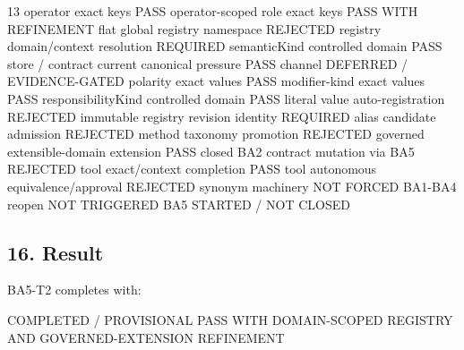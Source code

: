 \documentclass[
  10pt,
  a4paper,
]{article}
\newenvironment{Shaded}{}{}
\newcommand{\NormalTok}[1]{#1}
\begin{document}
\begin{Shaded}
\begin{Highlighting}[]
\NormalTok{13 operator exact keys                                  PASS}
\NormalTok{operator{-}scoped role exact keys                         PASS WITH REFINEMENT}
\NormalTok{flat global registry namespace                          REJECTED}
\NormalTok{registry domain/context resolution                      REQUIRED}
\NormalTok{semanticKind controlled domain                          PASS}
\NormalTok{store / contract current canonical pressure             PASS}
\NormalTok{channel                                                  DEFERRED / EVIDENCE{-}GATED}
\NormalTok{polarity exact values                                    PASS}
\NormalTok{modifier{-}kind exact values                              PASS}
\NormalTok{responsibilityKind controlled domain                    PASS}
\NormalTok{literal value auto{-}registration                         REJECTED}
\NormalTok{immutable registry revision identity                    REQUIRED}
\NormalTok{alias candidate admission                               REJECTED}
\NormalTok{method taxonomy promotion                               REJECTED}
\NormalTok{governed extensible{-}domain extension                    PASS}
\NormalTok{closed BA2 contract mutation via BA5                     REJECTED}
\NormalTok{tool exact/context completion                           PASS}
\NormalTok{tool autonomous equivalence/approval                    REJECTED}
\NormalTok{synonym machinery                                       NOT FORCED}
\NormalTok{BA1{-}BA4 reopen                                          NOT TRIGGERED}
\NormalTok{BA5                                                      STARTED / NOT CLOSED}
\end{Highlighting}
\end{Shaded}

\subsection{16. Result}\label{result}

BA5-T2 completes with:

\begin{Shaded}
\begin{Highlighting}[]
\NormalTok{COMPLETED / PROVISIONAL PASS WITH}
\NormalTok{DOMAIN{-}SCOPED REGISTRY AND GOVERNED{-}EXTENSION REFINEMENT}
\end{Highlighting}
\end{Shaded}
\end{document}
